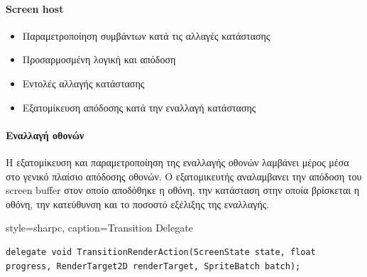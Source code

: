 	\paragraph{Screen host}
	\begin{itemize}
		\item Παραμετροποίηση συμβάντων κατά τις αλλαγές κατάστασης
		\item Προσαρμοσμένη λογική και απόδοση 
		\item Εντολές αλλαγής κατάστασης
		\item Εξατομίκευση απόδοσης κατά την εναλλαγή κατάστασης
	\end{itemize}
	
	\paragraph{Εναλλαγή οθονών}
	Η εξατομίκευση και παραμετροποίηση της εναλλαγής οθονών λαμβάνει μέρος μέσα στο γενικό πλαίσιο απόδοσης οθονών. Ο εξατομικευτής αναλαμβανει την απόδοση του screen buffer στον οποίο αποδόθηκε η οθόνη, την κατάσταση στην οποία βρίσκεται η οθόνη, την κατεύθυνση και το ποσοστό εξέλιξης της εναλλαγής. 
			
	\lstset
	{
		style=sharpc, 
		caption={Transition Delegate}
	}
	\begin{lstlisting}	
delegate void TransitionRenderAction(ScreenState state, float progress, RenderTarget2D renderTarget, SpriteBatch batch);
	\end{lstlisting}
	
	
